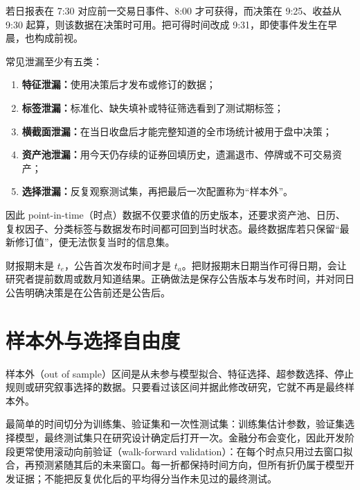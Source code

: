若日报表在 7:30 对应前一交易日事件、8:00 才可获得，而决策在 9:25、收益从 9:30 起算，则该数据在决策时可用。把可得时间改成 9:31，即使事件发生在早晨，也构成前视。


常见泄漏至少有五类：
\begin{enumerate}[leftmargin=*]
  \item \textbf{特征泄漏：}使用决策后才发布或修订的数据；
  \item \textbf{标签泄漏：}标准化、缺失填补或特征筛选看到了测试期标签；
  \item \textbf{横截面泄漏：}在当日收盘后才能完整知道的全市场统计被用于盘中决策；
  \item \textbf{资产池泄漏：}用今天仍存续的证券回填历史，遗漏退市、停牌或不可交易资产；
  \item \textbf{选择泄漏：}反复观察测试集，再把最后一次配置称为“样本外”。
\end{enumerate}
因此 point-in-time（时点）数据不仅要求值的历史版本，还要求资产池、日历、复权因子、分类标签与数据发布时间都可回到当时状态。最终数据库若只保留“最新修订值”，便无法恢复当时的信息集。

\begin{example}
财报期末是 $t_e$，公告首次发布时间才是 $t_a$。把财报期末日期当作可得日期，会让研究者提前数周或数月知道结果。正确做法是保存公告版本与发布时间，并对同日公告明确决策是在公告前还是公告后。
\end{example}

\section{样本外与选择自由度}

\begin{definition}[样本外]
样本外（out of sample）区间是从未参与模型拟合、特征选择、超参数选择、停止规则或研究叙事选择的数据。只要看过该区间并据此修改研究，它就不再是最终样本外。
\end{definition}



最简单的时间切分为训练集、验证集和一次性测试集：训练集估计参数，验证集选择模型，最终测试集只在研究设计确定后打开一次。金融分布会变化，因此开发阶段更常使用滚动向前验证（walk-forward validation）：在每个时点只用过去窗口拟合，再预测紧随其后的未来窗口。每一折都保持时间方向，但所有折仍属于模型开发证据；不能把反复优化后的平均得分当作未见过的最终测试。

